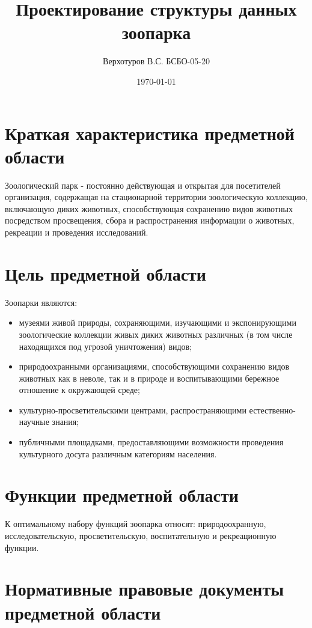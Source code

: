 \documentclass[12pt, a4paper]{article}
\title{Проектирование структуры данных зоопарка}
\author{Верхотуров В.С. БСБО-05-20}
\affil{РТУ МИРЭА}
\date{\today}
\begin{document}
\maketitle

\section{Краткая характеристика предметной области}

Зоологический парк - постоянно действующая и открытая для посетителей организация, содержащая на стационарной территории зоологическую коллекцию, включающую диких животных, способствующая сохранению видов животных посредством просвещения, сбора и распространения информации о животных, рекреации и проведения исследований.


\section{Цель предметной области}

Зоопарки являются:
\begin{itemize}
    \item музеями живой природы, сохраняющими, изучающими и экспонирующими зоологические коллекции живых диких животных различных (в том числе находящихся под угрозой уничтожения) видов;
    
    \item природоохранными организациями, способствующими сохранению видов животных как в неволе, так и в природе и воспитывающими бережное отношение к окружающей среде;
    
    \item культурно-просветительскими центрами, распространяющими е\-сте\-стве\-нно-на\-уч\-ны\-е знания;
    
    \item публичными площадками, предоставляющими возможности проведения культурного досуга различным категориям населения.
\end{itemize}

\section{Функции предметной области}

К оптимальному набору функций зоопарка относят: природоохранную, исследовательскую, просветительскую, воспитательную и рекреационную функции.

\section{Нормативные правовые документы предметной области}
\end{document}
